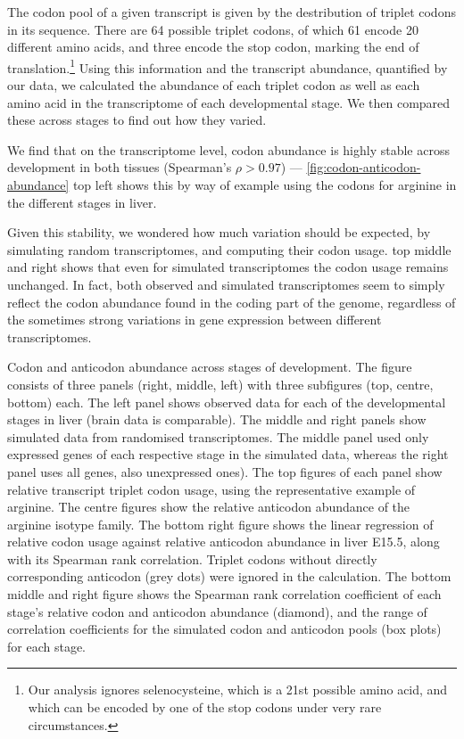 The codon pool of a given \mrna transcript is given by the destribution of
triplet codons in its sequence. There are 64 possible triplet codons, of which
61 encode 20 different amino acids, and three encode the stop codon, marking the
end of translation.\footnote{Our analysis ignores selenocysteine, which is a
\num{21}st possible amino acid, and which can be encoded by one of the stop
codons under very rare circumstances.} Using this information and the transcript
abundance, quantified by our \rnaseq data, we calculated the abundance of each
triplet codon as well as each amino acid in the transcriptome of each
developmental stage. We then compared these across stages to find out how they
varied.

We find that on the transcriptome level, codon abundance is highly stable across
development in both tissues (Spearman’s \(\rho > 0.97\)) ---
\cref{fig:codon-anticodon-abundance} top left shows this by way of example using
the codons for arginine in the different stages in liver.

Given this stability, we wondered how much variation should be expected, by
simulating random transcriptomes, and computing their codon usage.
 top middle and right shows that even for
simulated transcriptomes the codon usage remains unchanged. In fact, both
observed and simulated transcriptomes seem to simply reflect the codon abundance
found in the coding part of the genome, regardless of the sometimes strong
variations in gene expression between different transcriptomes.

    {Codon and anticodon abundance across stages of development.}
    {The figure consists of three panels (right, middle, left) with three
    subfigures (top, centre, bottom) each. The left panel shows observed data
    for each of the developmental stages in liver (brain data is comparable).
    The middle and right panels show simulated data from randomised
    transcriptomes. The middle panel used only expressed genes of each
    respective stage in the simulated data, whereas the right panel uses all
    genes, also unexpressed ones). The top figures of each panel show relative
    \mrna transcript triplet codon usage, using the representative example of
    arginine. The centre figures show the relative \trna anticodon abundance of
    the arginine isotype family. The bottom right figure shows the linear
    regression of relative codon usage against relative anticodon abundance in
    liver E15.5, along with its Spearman rank correlation. Triplet codons
    without directly corresponding anticodon (grey dots) were ignored in the
    calculation. The bottom middle and right figure shows the Spearman rank
    correlation coefficient of each stage’s relative codon and anticodon
    abundance (diamond), and the range of correlation coefficients for the
    simulated codon and anticodon pools (box plots) for each stage.}

